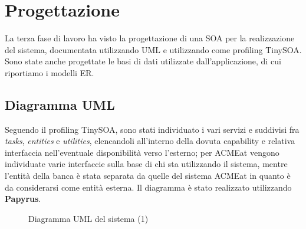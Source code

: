 \documentclass[11pt]{article} %
\begin{document}
\clearpage

\section{Progettazione}
\label{sez:progettazione}

La terza fase di lavoro ha visto la progettazione di una SOA per la realizzazione del sistema, documentata utilizzando UML e utilizzando come profiling TinySOA. Sono state anche progettate le basi di dati utilizzate dall'applicazione, di cui riportiamo i modelli ER.

\subsection{Diagramma UML}

Seguendo il profiling TinySOA, sono stati individuato i vari servizi e suddivisi fra \emph{tasks}, \emph{entities} e \emph{utilities}, elencandoli all'interno della dovuta capability e relativa interfaccia nell'eventuale disponibilità verso l'esterno; per ACMEat vengono individuate varie interfaccie sulla base di chi sta utilizzando il sistema, mentre l'entità della banca è stata separata da quelle del sistema ACMEat in quanto è da considerarsi come entità esterna. Il diagramma è stato realizzato utilizzando \textbf{Papyrus}.

\begin{figure}[H]
\begin{center}
\caption{Diagramma UML del sistema (1)}
\end{center}
\end{figure}
\end{document}
